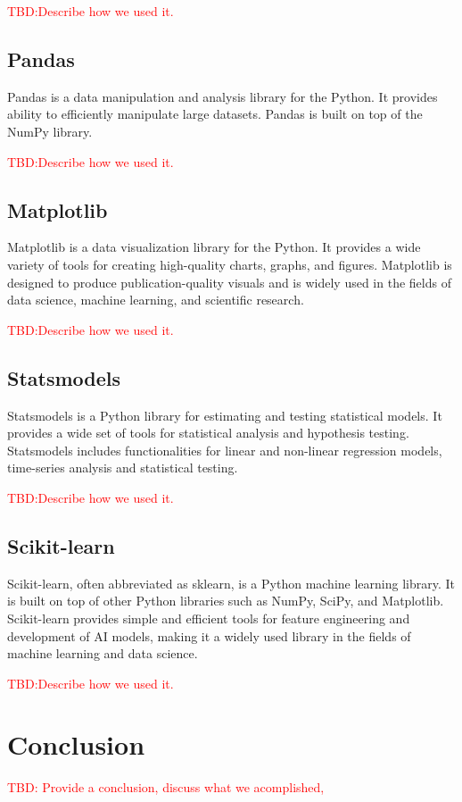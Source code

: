 \documentclass[12pt,a4paper]{article}
\begin{document}
\textcolor{red}{TBD:Describe how we used it.}

\subsection{Pandas \cite{reback2020pandas}}

Pandas is a data manipulation and analysis library for the Python. It provides ability to efficiently manipulate large datasets. Pandas is built on top of the NumPy library.

\textcolor{red}{TBD:Describe how we used it.}



\subsection{Matplotlib \cite{Hunter:2007}}
Matplotlib is a data visualization library for the Python. It provides a wide variety of tools for creating high-quality charts, graphs, and figures. Matplotlib is designed to produce publication-quality visuals and is widely used in the fields of data science, machine learning, and scientific research.

\textcolor{red}{TBD:Describe how we used it.}

\subsection{Statsmodels \cite{seabold2010statsmodels}}

Statsmodels is a Python library for estimating and testing statistical models. It provides a wide set of tools for statistical analysis and hypothesis testing. Statsmodels includes functionalities for linear and non-linear regression models, time-series analysis and statistical testing.

\textcolor{red}{TBD:Describe how we used it.}

\subsection{Scikit-learn \cite{pedregosa2011scikit}}

Scikit-learn, often abbreviated as sklearn, is a Python machine learning library. It is built on top of other Python libraries such as NumPy, SciPy, and Matplotlib. Scikit-learn provides simple and efficient tools for feature engineering and development of AI models, making it a widely used library in the fields of machine learning and data science.

\textcolor{red}{TBD:Describe how we used it.}




\newpage
\section{Conclusion}
\textcolor{red}{TBD: Provide a conclusion, discuss what we acomplished, }

\clearpage


\end{document}
